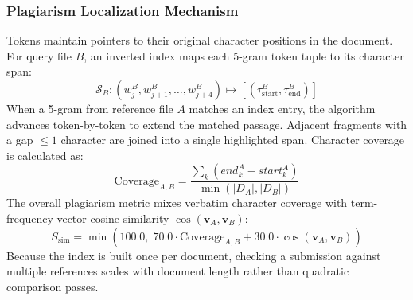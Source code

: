 \documentclass[conference]{IEEEtran}
\begin{document}
\subsubsection{Plagiarism Localization Mechanism}
Tokens maintain pointers to their original character positions in the document. For query file $B$, an inverted index maps each 5-gram token tuple to its character span:
\begin{equation}
\mathcal{S}_B: (w_j^B, w_{j+1}^B, \dots, w_{j+4}^B) \mapsto [(\tau_{\text{start}}^B, \tau_{\text{end}}^B)]
\end{equation}
When a 5-gram from reference file $A$ matches an index entry, the algorithm advances token-by-token to extend the matched passage. Adjacent fragments with a gap $\le 1$ character are joined into a single highlighted span. Character coverage is calculated as:
\begin{equation}
\text{Coverage}_{A,B} = \frac{\sum_{k} (end_k^A - start_k^A)}{\min(|D_A|, |D_B|)}
\end{equation}
The overall plagiarism metric mixes verbatim character coverage with term-frequency vector cosine similarity $\cos(\mathbf{v}_A, \mathbf{v}_B)$:
\begin{equation}
S_{\text{sim}} = \min\left(100.0, \; 70.0 \cdot \text{Coverage}_{A,B} + 30.0 \cdot \cos(\mathbf{v}_A, \mathbf{v}_B)\right)
\end{equation}
Because the index is built once per document, checking a submission against multiple references scales with document length rather than quadratic comparison passes.
\end{document}
